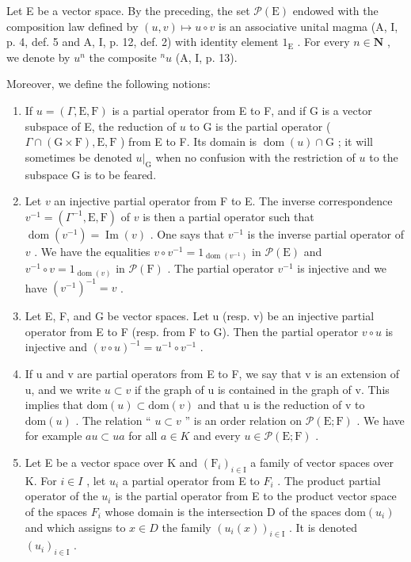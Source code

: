 Let E be a vector space. By the preceding, the set \(\mathcal{P}(\mathrm{E})\) endowed with the composition law defined by \((u,v)\mapsto u\circ v\) is an associative unital magma (A, I, p. 4, def. 5 and A, I, p. 12, def. 2) with identity element \(1_{\mathrm{E}}\) . For every \(n\in \mathbf{N}\) , we denote by \(u^n\) the composite \({}^n u\) (A, I, p. 13).

Moreover, we define the following notions:

\begin{enumerate}
\def\labelenumi{(\roman{enumi})}
\item
  If \(u = (\Gamma, \mathrm{E}, \mathrm{F})\) is a partial operator from E to F, and if G is a vector subspace of E, the reduction of \(u\) to G is the partial operator ( \(\Gamma \cap (\mathrm{G} \times \mathrm{F}), \mathrm{E}, \mathrm{F}\) ) from E to F. Its domain is \(\operatorname{dom}(u) \cap \mathrm{G}\) ; it will sometimes be denoted \(u|_{\mathrm{G}}\) when no confusion with the restriction of \(u\) to the subspace G is to be feared.
\item
  Let \(v\) an injective partial operator from F to E. The inverse correspondence \(v^{-1} = (\Gamma^{-1}, \mathrm{E}, \mathrm{F})\) of \(v\) is then a partial operator such that \(\operatorname{dom}(v^{-1}) = \operatorname{Im}(v)\) . One says that \(v^{-1}\) is the inverse partial operator of \(v\) . We have the equalities \(v \circ v^{-1} = 1_{\operatorname{dom}(v^{-1})}\) in \(\mathcal{P}(\mathrm{E})\) and \(v^{-1} \circ v = 1_{\operatorname{dom}(v)}\) in \(\mathcal{P}(\mathrm{F})\) . The partial operator \(v^{-1}\) is injective and we have \((v^{-1})^{-1} = v\) .
\item
  Let E, F, and G be vector spaces. Let u (resp. v) be an injective partial operator from E to F (resp. from F to G). Then the partial operator \(v \circ u\) is injective and \((v \circ u)^{-1} = u^{-1} \circ v^{-1}\) .
\item
  If u and v are partial operators from E to F, we say that v is an extension of u, and we write \(u \subset v\) if the graph of u is contained in the graph of v. This implies that \(\text{dom}(u) \subset \text{dom}(v)\) and that u is the reduction of v to \(\text{dom}(u)\) . The relation “ \(u \subset v\) ” is an order relation on \(\mathcal{P}(\text{E};\text{F})\) . We have for example \(au \subset ua\) for all \(a \in K\) and every \(u \in \mathcal{P}(\text{E};\text{F})\) .
\item
  Let E be a vector space over K and \((\mathrm{F}_{i})_{i\in\mathrm{I}}\) a family of vector spaces over K. For \(i\in I\) , let \(u_{i}\) a partial operator from E to \(F_{i}\) . The product partial operator of the \(u_{i}\) is the partial operator from E to the product vector space of the spaces \(F_{i}\) whose domain is the intersection D of the spaces \(\mathrm{dom}(u_{i})\) and which assigns to \(x\in D\) the family \((u_{i}(x))_{i\in\mathrm{I}}\) . It is denoted \((u_{i})_{i\in\mathrm{I}}\) .

\end{enumerate}
